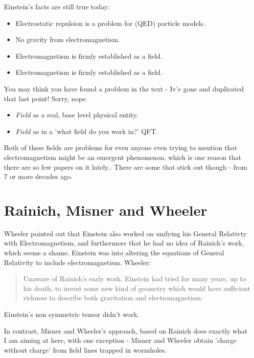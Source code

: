 \documentclass[../rzero]{subfiles}
\begin{document}
Einstein's facts are still true today:
\begin{itemize}
	\item Electrostatic repulsion is a problem for (QED) particle models.
	\item No gravity from electromagnetism.
	\item Electromagnetism is firmly established as a field.
	\item Electromagnetism is firmly established as a field.
\end{itemize}

You may think you have found a problem in the text - Iv'e gone and duplicated that last point! Sorry, nope. 

\begin{itemize}
	\item \textit{Field} as a real, base level physical entity.
	\item \textit{Field} as in a 'what field do you work in?' QFT.
\end{itemize}

Both of these fields are problems for even anyone even trying to mention that electromagnetism might be an emergent phenomenon, which is one reason that there are so few papers on it lately.\cite{barceloElectromagnetismEmergentPhenomenon2014}. There are some that stick out though - from 7 or more decades ago.

\section{Rainich, Misner and Wheeler}

Wheeler pointed out that Einstein also worked on unifying his General Relativty with Electromagnetism, and furthermore that he had no idea of Rainich's work, which seems a shame. Einstein was into altering the equations of General Relativity to include electromagnetism. Wheeler\cite{wheelerCurvedEmptySpaceTime1966}: 

\begin{quotation}
	 Unaware of Rainich's early work, Einstein had tried for many years, up to his death, to invent some new kind of geometry\cite{einstein2003meaning} which would have sufficient richness to describe both gravitation and electromagnetism.
\end{quotation}
	Einstein's non symmetric tensor didn't work. 
	
In contrast, Misner and Wheeler's approach\cite{Misner:1957mt}\cite{Wheeler1957quantumGeo}, based on Rainich\cite{rainichElectrodynamicsGeneralRelativity1925} does exactly what I am aiming at here, with one exception - Misner and Wheeler obtain 'charge without charge' from field lines trapped in wormholes. 
\end{document}
